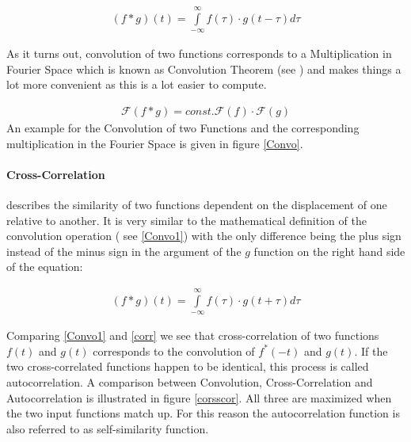 \begin{align}
(f*g)(t)=\int\limits_{-\infty}^{\infty} f(\tau)\cdot g(t-\tau) d\tau \label{Convo1}
\end{align}

As it turns out, convolution of two functions corresponds to a Multiplication in Fourier Space which is known as Convolution Theorem (see \cite{demtroeder2}) and makes things a lot more convenient as this is a lot easier to compute.

\begin{align}
\mathscr{F}(f*g)=const. \mathscr{F}(f)\cdot \mathscr{F}(g)
\end{align}
 An example for the Convolution of two Functions and the corresponding multiplication in the Fourier Space is given in figure \ref{Convo}.
 

\paragraph{Cross-Correlation} describes the similarity of two functions dependent on the displacement of one relative to another. It is very similar to the mathematical definition of the convolution operation ( see \ref{Convo1}) with the only difference being the plus sign instead of the minus sign in the argument of the $g$ function on the right hand side of the equation:

\begin{align}
(f*g)(t)=\int\limits_{-\infty}^{\infty} f(\tau)\cdot g(t+\tau) d\tau \label{corr}
\end{align}

Comparing \ref{Convo1} and \ref{corr} we see that cross-correlation of two functions $f(t)$ and $g(t)$ corresponds to the convolution of $f^*(-t)$ and $g(t)$. If the two cross-correlated functions happen to be identical, this process is called autocorrelation.
A comparison between Convolution, Cross-Correlation and Autocorrelation is illustrated in figure \ref{corsscor}. All three are maximized when the two input functions match up. For this reason the autocorrelation function is also referred to as self-similarity function.

 

